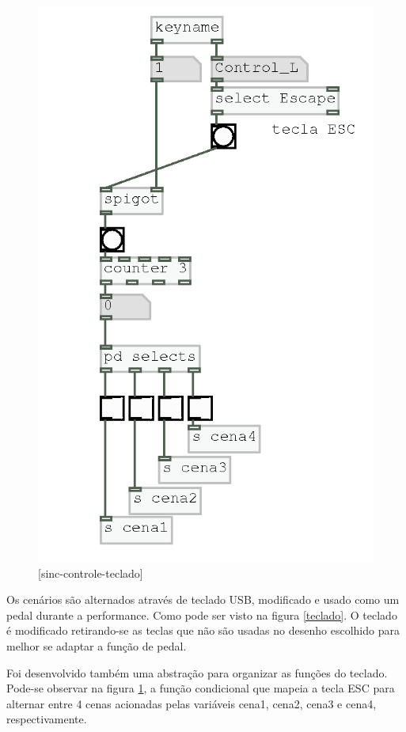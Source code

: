 \documentclass[draft]{ppgmus}
\begin{document}
\begin{figure}
\includegraphics[scale=.4]{sinc-controle-teclado}
\caption{[sinc-controle-teclado]}
\label{sinc-controle-teclado}
\end{figure}

Os cenários são alternados através de teclado USB, modificado e usado como
um pedal durante a performance. Como pode ser visto na figura \ref{teclado}.
O teclado é modificado retirando-se as teclas que não são usadas no desenho escolhido
para melhor se adaptar a função de pedal.

Foi desenvolvido também uma abstração para organizar as funções do teclado.
Pode-se observar na figura \ref{sinc-controle-teclado}, a função condicional
que mapeia a tecla ESC para alternar entre 4 cenas acionadas pelas variáveis
cena1, cena2, cena3 e cena4, respectivamente.
\end{document}
